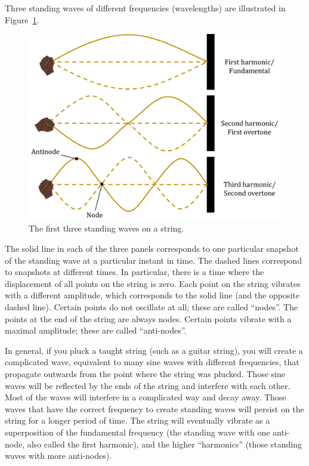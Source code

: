Three standing waves of different frequencies (wavelengths) are illustrated in Figure~\ref{fig:waves:standing}.

\begin{figure}[!htbp]
\centering
\includegraphics[width=0.7\linewidth]{files/standing-8a3bc3fb194afc707328d9f485a51d61.png}
\caption[]{The first three standing waves on a string.}
\label{fig:waves:standing}
\end{figure}

The solid line in each of the three panels corresponds to one particular snapshot of the standing wave at a particular instant in time. The dashed lines correspond to snapshots at different times. In particular, there is a time where the displacement of all points on the string is zero. Each point on the string vibrates with a different amplitude, which corresponds to the solid line (and the opposite dashed line). Certain points do not oscillate at all; these are called ``nodes''. The points at the end of the string are always nodes. Certain points vibrate with a maximal amplitude; these are called ``anti-nodes''.

In general, if you pluck a taught string (such as a guitar string), you will create a complicated wave, equivalent to many sine waves with different frequencies, that propagate outwards from the point where the string was plucked. Those sine waves will be reflected by the ends of the string and interfere with each other. Most of the waves will interfere in a complicated way and decay away. Those waves that have the correct frequency to create standing waves will persist on the string for a longer period of time. The string will eventually vibrate as a superposition of the fundamental frequency (the standing wave with one anti-node, also called the first harmonic), and the higher ``harmonics'' (those standing waves with more anti-nodes).

